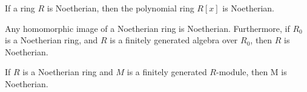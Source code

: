 \begin{thm}
    \label{hilbertbasis}
    If a ring $R$ is Noetherian, then the polynomial ring $R[x]$ is Noetherian.
\end{thm}
\begin{cor}
    \label{hilbertbasiscor1}
    Any homomorphic image of a Noetherian ring is Noetherian. Furthermore, if $R_0$ is
    a Noetherian ring, and $R$ is a finitely generated algebra over $R_0$, then $R$ is
    Noetherian.
\end{cor}
\begin{prop}
    \label{hilbertbasisprop1}
    If $R$ is a Noetherian ring and $M$ is a finitely generated $R$-module, then M is
    Noetherian.
\end{prop}